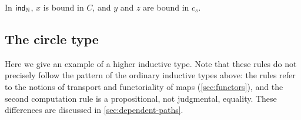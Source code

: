 
In $\mathsf{ind}_{\mathbb{N}}$, $x$ is bound in $C$, and $y$ and $z$ are bound in $c_s$.

\subsection{The circle type}

Here we give an example of a higher inductive type. Note that these rules do not
precisely follow the pattern of the ordinary inductive types above: the rules
refer to the notions of transport and functoriality of maps
(\autoref{sec:functors}), and the second computation rule is a propositional,
not judgmental, equality. These differences are discussed in
\autoref{sec:dependent-paths}.

